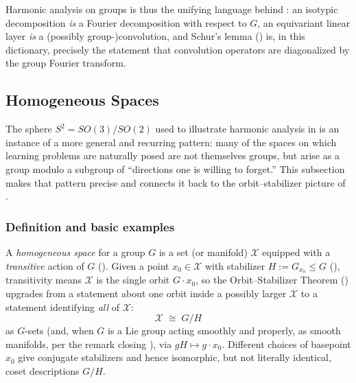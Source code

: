 \documentclass[mathematics,review,submit,moreauthors]{Definitions/mdpi}
\begin{document}
Harmonic analysis on groups is thus the unifying language behind
: an isotypic decomposition
\emph{is} a Fourier decomposition with respect to $G$, an equivariant linear
layer \emph{is} a (possibly group-)convolution, and Schur's lemma
() is, in this dictionary, precisely the statement that
convolution operators are diagonalized by the group Fourier transform.



\subsection{Homogeneous Spaces}
\label{subsec:homogeneous-spaces}

The sphere $S^2 = SO(3)/SO(2)$ used to illustrate harmonic analysis in
 is an instance of a more
general and recurring pattern: many of the spaces on which learning problems
are naturally posed are not themselves groups, but arise as a group modulo
a subgroup of ``directions one is willing to forget.'' This subsection makes
that pattern precise and connects it back to the orbit--stabilizer picture
of .

\subsubsection{Definition and basic examples}
\label{subsubsec:homogeneous-spaces-def}

\begin{Definition}
\label{def:homogeneous-space}
A \emph{homogeneous space} for a group $G$ is a set (or manifold) $\mathcal{X}$
equipped with a \emph{transitive} action of $G$
(). Given a point $x_0 \in \mathcal{X}$ with
stabilizer $H := G_{x_0} \leq G$ (),
transitivity means $\mathcal{X}$ is the single orbit $G \cdot x_0$, so the
Orbit--Stabilizer Theorem () upgrades from
a statement about one orbit inside a possibly larger $\mathcal{X}$ to a statement
identifying \emph{all} of $\mathcal{X}$:
\[
    \mathcal{X} \;\cong\; G / H
\]
as $G$-sets (and, when $G$ is a Lie group acting smoothly and properly, as
smooth manifolds, per the remark closing
), via $gH \mapsto g \cdot x_0$. Different choices
of basepoint $x_0$ give conjugate stabilizers and hence isomorphic, but not
literally identical, coset descriptions $G/H$.
\end{Definition}
\end{document}
